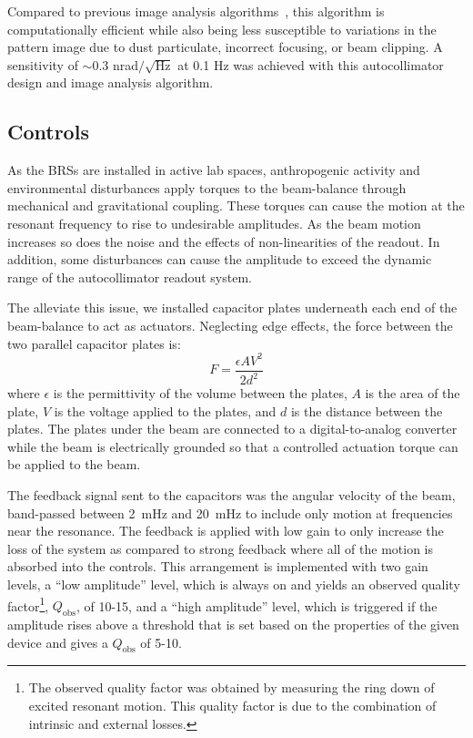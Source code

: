 \documentclass [12pt, proquest]{uwthesis}[2019]
\begin{document}
Compared to previous image analysis algorithms~\cite{MSA}, this algorithm is computationally efficient while also being less susceptible to variations in the pattern image due to dust particulate, incorrect focusing, or beam clipping. A sensitivity of $\sim$0.3 nrad$/\sqrt{\text{Hz}}$ at 0.1 Hz was achieved with this autocollimator design and image analysis algorithm.

\subsection{Controls}

\quad As the BRSs are installed in active lab spaces, anthropogenic activity and environmental disturbances apply torques to the beam-balance through mechanical and gravitational coupling. These torques can cause the motion at the resonant frequency to rise to undesirable amplitudes. As the beam motion increases so does the noise and the effects of non-linearities of the readout. In addition, some disturbances can cause the amplitude to exceed the dynamic range of the autocollimator readout system.

The alleviate this issue, we installed capacitor plates underneath each end of the beam-balance to act as actuators. Neglecting edge effects, the force between the two parallel capacitor plates is: 
\begin{equation}
F=\frac{\epsilon A V^2}{2d^2} \label{cap}
\end{equation}
where $\epsilon$ is the permittivity of the volume between the plates, $A$ is the area of the plate, $V$ is the voltage applied to the plates, and $d$ is the distance between the plates. The plates under the beam are connected to a digital-to-analog converter while the beam is electrically grounded so that a controlled actuation torque can be applied to the beam. 

The feedback signal sent to the capacitors was the angular velocity of the beam, band-passed between 2~mHz and 20~mHz to include only motion at frequencies near the resonance. The feedback is applied with low gain to only increase the loss of the system as compared to strong feedback where all of the motion is absorbed into the controls. This arrangement is implemented with two gain levels, a ``low amplitude'' level, which is always on and yields an observed quality factor\footnote{The observed quality factor was obtained by measuring the ring down of excited resonant motion. This quality factor is due to the combination of intrinsic and external losses.}, $Q_\text{obs}$, of 10-15, and a ``high amplitude'' level, which is triggered if the amplitude rises above a threshold that is set based on the properties of the given device and gives a $Q_\text{obs}$ of 5-10.
\end{document}
